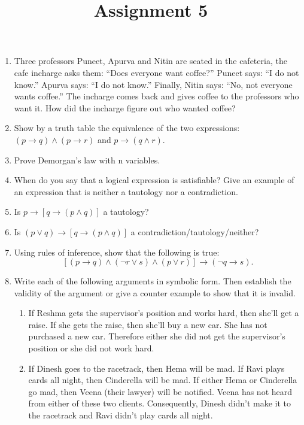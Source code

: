 \documentclass[a4paper]{article}
\title{Assignment 5}
\begin{document}
\maketitle
\begin{enumerate}



\item  Three professors Puneet, Apurva and Nitin are seated in the cafeteria, the cafe incharge asks them: “Does everyone want coffee?” Puneet says: “I do not know.” Apurva says: “I do not know.” Finally, Nitin says: “No, not everyone wants coffee.” The incharge comes back and gives coffee to the professors who want it. How did the incharge figure out who wanted coffee?
	
\item Show by a truth table the equivalence of the two expressions: $(p\rightarrow q)\land (p\rightarrow r)$ and 
	$p\rightarrow (q \land r) $.

\item Prove Demorgan's law with n variables.

\item When do you say that a logical expression is satisfiable? Give an example of an expression that is neither a tautology nor a contradiction.


\item Is $p\rightarrow [q\rightarrow(p\land q)]$ a tautology?

\item Is $(p\lor q)\rightarrow[q\rightarrow (p\land q)]$ a contradiction/tautology/neither?

\item Using rules of inference, show that the following is true: $$[(p\rightarrow q)\land(\neg r \lor s)\land(p\lor r)]\rightarrow (\neg q\rightarrow s).$$ 

\item Write each of the following arguments in symbolic form. Then establish the validity of the argument or give a counter example to show that it is invalid.
	\begin{enumerate}
		\item If Reshma gets the supervisor's position and works hard, then she'll get a raise. If she gets the raise, then she'll buy a new car. She has not purchased a new car. Therefore either she did not get the supervisor's position or she did not work hard.
		\item If Dinesh goes to the racetrack, then Hema will be mad. If Ravi plays cards all night, then Cinderella will be mad. If either Hema or Cinderella go mad, then Veena (their lawyer) will be notified. Veena has not heard from either of these two clients. Consequently, Dinesh didn't make it to the racetrack and Ravi didn't play cards all night.
	\end{enumerate}


\end{enumerate}
\end{document}
